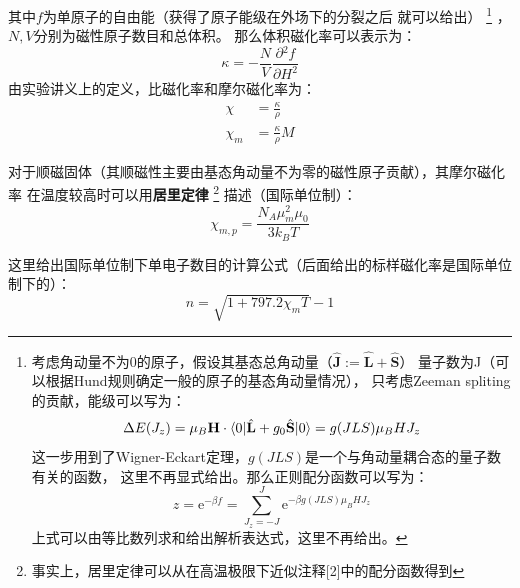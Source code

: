\documentclass[a4paper,zihao=5,UTF8]{ctexart}
\def\e{\mathrm{e}}
\newcommand{\mb}[1]{\mathbf{#1}}
\newcommand{\pdv}[2]{\frac{\partial{#1}}{\partial{#2}}}
\begin{document}
        其中$f$为单原子的自由能（获得了原子能级在外场下的分裂之后
        就可以给出）
        \footnote{
            考虑角动量不为0的原子，假设其基态总角动量（$\hat{\mb{J}}:=\hat{\mb{L}} + \hat{\mb{S}}$）
            量子数为J（可以根据Hund规则确定一般的原子的基态角动量情况），
            只考虑Zeeman spliting的贡献，能级可以写为：
            \begin{equation}
                \Delta E(J_z) = \mu_B\mb{H}\cdot\braket{0|\hat{\mb{L}} + g_0\hat{\mb{S}}|0} = g(JLS)\mu_B HJ_z
            \end{equation}
            这一步用到了Wigner-Eckart定理，$g(JLS)$是一个与角动量耦合态的量子数有关的函数，
            这里不再显式给出。那么正则配分函数可以写为：
            \begin{equation}
                z = \e^{-\beta f} = \sum_{J_z = -J}^{J}\e^{-\beta g(JLS)\mu_BHJ_z}
            \end{equation}
            上式可以由等比数列求和给出解析表达式，这里不再给出。
        }
        ，$N,V$分别为磁性原子数目和总体积。
        那么体积磁化率可以表示为：
        \begin{equation}
            \kappa = -\frac{N}{V}\pdv{^2f}{H^2}
        \end{equation}
        由实验讲义上的定义，比磁化率和摩尔磁化率为：
        \begin{equation}
            \begin{split}
            \chi &= \frac{\kappa}{\rho}\\
            \chi_{m} &= \frac{\kappa}{\rho}M
            \end{split}
        \end{equation}
        \par 
        对于顺磁固体（其顺磁性主要由基态角动量不为零的磁性原子贡献），其摩尔磁化率
        在温度较高时可以用\textbf{居里定律}
        \footnote{
            事实上，居里定律可以从在高温极限下近似注释[2]中的配分函数得到
        }
        描述（国际单位制）：
        \begin{equation}
            \chi_{m,p} = \frac{N_A\mu_{m}^2\mu_0}{3k_B T}
        \end{equation}
        \par 
        这里给出国际单位制下单电子数目的计算公式（后面给出的标样磁化率是国际单位制下的）：
        \begin{equation}
            n = \sqrt{1 + 797.2\chi_m T} - 1
        \end{equation}
\end{document}
